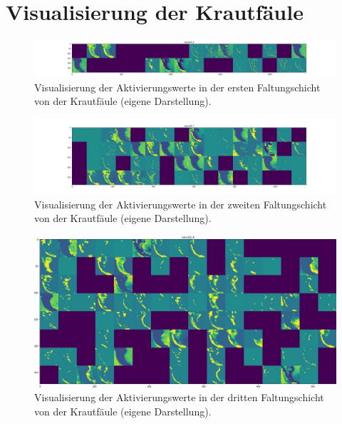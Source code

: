 \chapter{Visualisierung der Krautfäule}
\label{anahnge}
\begin{figure}[h!]
	\centering
	\includegraphics[width=\textwidth]{visualisierungen/late/activation/late_sample0.JPG}
	\caption{Visualisierung der Aktivierungswerte in der ersten Faltungschicht von der Krautfäule (eigene Darstellung).}
	\label{}
\end{figure}

\begin{figure}[h!]
	\centering
	\includegraphics[width=\textwidth]{visualisierungen/late/activation/late_sample3.JPG}
	\caption{Visualisierung der Aktivierungswerte in der zweiten Faltungschicht von der Krautfäule (eigene Darstellung).}
	\label{}
\end{figure}

\begin{figure}[h!]
	\centering
	\includegraphics[width=\textwidth]{visualisierungen/late/activation/late_sample6.JPG}
	\caption{Visualisierung der Aktivierungswerte in der dritten Faltungschicht von der Krautfäule (eigene Darstellung).}
	\label{}
\end{figure}


